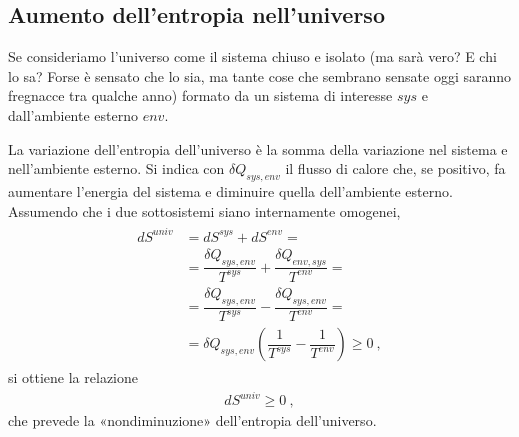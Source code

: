 \documentclass[letterpaper,10pt,italian]{jupyterBook}
\begin{document}
\subsection{Aumento dell’entropia nell’universo}
\label{\detokenize{ch/thermodynamics/principles-second:aumento-dell-entropia-nell-universo}}
\sphinxAtStartPar
Se consideriamo l’universo come il sistema chiuso e isolato (ma sarà vero? E chi lo sa? Forse è sensato che lo sia, ma tante cose che sembrano sensate oggi saranno fregnacce tra qualche anno) formato da un sistema di interesse \(sys\) e dall’ambiente esterno \(env\).

\sphinxAtStartPar
La variazione dell’entropia dell’universo è la somma della variazione nel sistema e nell’ambiente esterno. Si indica con \(\delta Q_{sys,env}\) il flusso di calore che, se positivo, fa aumentare l’energia del sistema e diminuire quella dell’ambiente esterno. Assumendo che i due sotto\sphinxhyphen{}sistemi siano internamente omogenei,
\begin{equation*}
\begin{split}\begin{aligned}
d S^{univ} & = d S^{sys} + d S^{env} = \\
           & = \dfrac{\delta Q_{sys,env}}{T^{sys}} + \dfrac{\delta Q_{env,sys}}{T^{env}} = \\
           & = \dfrac{\delta Q_{sys,env}}{T^{sys}} - \dfrac{\delta Q_{sys,env}}{T^{env}} = \\
           & = \delta Q_{sys,env} \left( \dfrac{1}{T^{sys}} - \dfrac{1}{T^{env}} \right) \ge 0 \ ,
\end{aligned}\end{split}
\end{equation*}
\sphinxAtStartPar
si ottiene la relazione
\begin{equation*}
\begin{split}dS^{univ} \ge 0 \ ,\end{split}
\end{equation*}
\sphinxAtStartPar
che prevede la «non\sphinxhyphen{}diminuzione» dell’entropia dell’universo.

\sphinxstepscope
\end{document}

